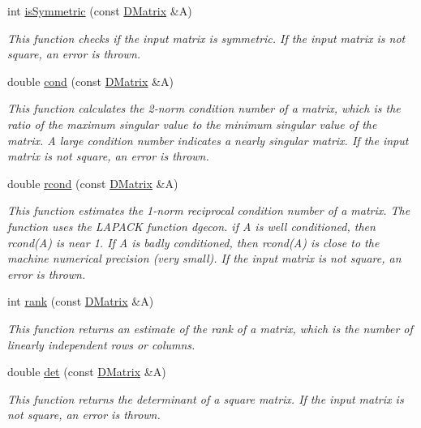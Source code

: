 \begin{DoxyCompactItemize}
int \hyperlink{classDMatrix_ad31c97e930c0fdc797ecd165f251fc27}{isSymmetric} (const \hyperlink{classDMatrix}{DMatrix} \&A)
\begin{DoxyCompactList}\small\item\em This function checks if the input matrix is symmetric. If the input matrix is not square, an error is thrown. \item\end{DoxyCompactList}\item 
double \hyperlink{classDMatrix_a474926f74756b827c79b7127a84a4bb6}{cond} (const \hyperlink{classDMatrix}{DMatrix} \&A)
\begin{DoxyCompactList}\small\item\em This function calculates the 2-\/norm condition number of a matrix, which is the ratio of the maximum singular value to the minimum singular value of the matrix. A large condition number indicates a nearly singular matrix. If the input matrix is not square, an error is thrown. \item\end{DoxyCompactList}\item 
double \hyperlink{classDMatrix_a5421e6760accac0eefb83d4a604e0612}{rcond} (const \hyperlink{classDMatrix}{DMatrix} \&A)
\begin{DoxyCompactList}\small\item\em This function estimates the 1-\/norm reciprocal condition number of a matrix. The function uses the LAPACK function dgecon. if A is well conditioned, then rcond(A) is near 1. If A is badly conditioned, then rcond(A) is close to the machine numerical precision (very small). If the input matrix is not square, an error is thrown. \item\end{DoxyCompactList}\item 
int \hyperlink{classDMatrix_a5379bc44e75307fc4f0242ef196ca2c8}{rank} (const \hyperlink{classDMatrix}{DMatrix} \&A)
\begin{DoxyCompactList}\small\item\em This function returns an estimate of the rank of a matrix, which is the number of linearly independent rows or columns. \item\end{DoxyCompactList}\item 
double \hyperlink{classDMatrix_aafe913bbf754d4c204e4d09033de4ff5}{det} (const \hyperlink{classDMatrix}{DMatrix} \&A)
\begin{DoxyCompactList}\small\item\em This function returns the determinant of a square matrix. If the input matrix is not square, an error is thrown. \item\end{DoxyCompactList}\item 

\end{DoxyCompactItemize}
